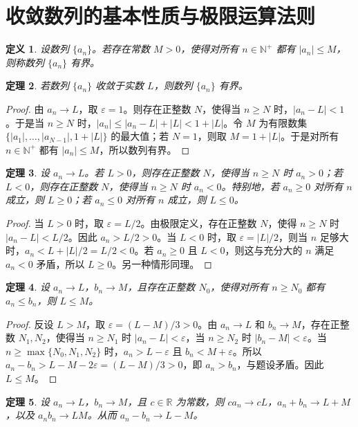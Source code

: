 \documentclass[UTF8,fontset=fandol,11pt]{ctexart}
\newtheorem{definition}{定义}[section]
\newtheorem{theorem}[definition]{定理}
\begin{document}
\section{收敛数列的基本性质与极限运算法则}\label{sec:S02}
\begin{definition}
设数列 $\{a_n\}$。若存在常数 $M>0$，使得对所有 $n\in\mathbb{N}^{+}$ 都有 $|a_n|\leq M$，则称数列 $\{a_n\}$ 有界。
\end{definition}
\begin{theorem}
\label{thm:convergent-bounded}若数列 $\{a_n\}$ 收敛于实数 $L$，则数列 $\{a_n\}$ 有界。
\end{theorem}
\begin{proof}
由 $a_n\to L$，取 $\varepsilon=1$。则存在正整数 $N$，使得当 $n\geq N$ 时，$|a_n-L|<1$。于是当 $n\geq N$ 时，$|a_n|\leq|a_n-L|+|L|<1+|L|$。令 $M$ 为有限数集 $\{|a_1|,\ldots,|a_{N-1}|,1+|L|\}$ 的最大值；若 $N=1$，则取 $M=1+|L|$。于是对所有 $n\in\mathbb{N}^{+}$ 都有 $|a_n|\leq M$，所以数列有界。
\end{proof}
\begin{theorem}
\label{thm:limit-sign}设 $a_n\to L$。若 $L>0$，则存在正整数 $N$，使得当 $n\geq N$ 时 $a_n>0$；若 $L<0$，则存在正整数 $N$，使得当 $n\geq N$ 时 $a_n<0$。特别地，若 $a_n\geq0$ 对所有 $n$ 成立，则 $L\geq0$；若 $a_n\leq0$ 对所有 $n$ 成立，则 $L\leq0$。
\end{theorem}
\begin{proof}
当 $L>0$ 时，取 $\varepsilon=L/2$。由极限定义，存在正整数 $N$，使得 $n\geq N$ 时 $|a_n-L|<L/2$。因此 $a_n>L/2>0$。当 $L<0$ 时，取 $\varepsilon=|L|/2$，则当 $n$ 足够大时，$a_n<L+|L|/2=L/2<0$。若 $a_n\geq0$ 且 $L<0$，则这与充分大的 $n$ 满足 $a_n<0$ 矛盾，所以 $L\geq0$。另一种情形同理。
\end{proof}
\begin{theorem}
\label{thm:limit-order}设 $a_n\to L$，$b_n\to M$，且存在正整数 $N_0$，使得对所有 $n\geq N_0$ 都有 $a_n\leq b_n$，则 $L\leq M$。
\end{theorem}
\begin{proof}
反设 $L>M$，取 $\varepsilon=(L-M)/3>0$。由 $a_n\to L$ 和 $b_n\to M$，存在正整数 $N_1,N_2$，使得当 $n\geq N_1$ 时 $|a_n-L|<\varepsilon$，当 $n\geq N_2$ 时 $|b_n-M|<\varepsilon$。当 $n\geq\max\{N_0,N_1,N_2\}$ 时，$a_n>L-\varepsilon$ 且 $b_n<M+\varepsilon$。所以 $a_n-b_n>L-M-2\varepsilon=(L-M)/3>0$，即 $a_n>b_n$，与题设矛盾。因此 $L\leq M$。
\end{proof}
\begin{theorem}
\label{thm:limit-sum-product}设 $a_n\to L$，$b_n\to M$，且 $c\in\mathbb{R}$ 为常数，则 $ca_n\to cL$，$a_n+b_n\to L+M$，以及 $a_nb_n\to LM$。从而 $a_n-b_n\to L-M$。
\end{theorem}
\end{document}
